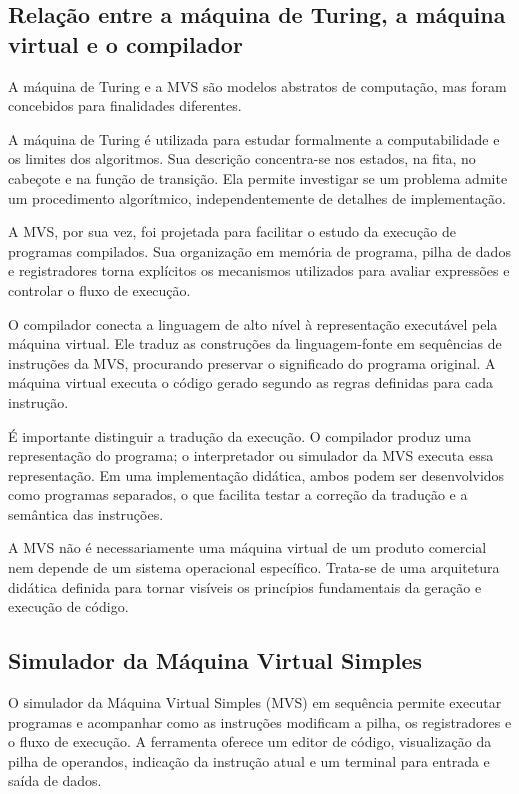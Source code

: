 \documentclass[
  brazilian,
  letterpaper,
]{book}
\theoremstyle{plain}
\theoremstyle{definition}
\theoremstyle{remark}
\begin{document}
\subsection{Relação entre a máquina de Turing, a máquina virtual e o
compilador}\label{relauxe7uxe3o-entre-a-muxe1quina-de-turing-a-muxe1quina-virtual-e-o-compilador}

A máquina de Turing e a MVS são modelos abstratos de computação, mas
foram concebidos para finalidades diferentes.

A máquina de Turing é utilizada para estudar formalmente a
computabilidade e os limites dos algoritmos. Sua descrição concentra-se
nos estados, na fita, no cabeçote e na função de transição. Ela permite
investigar se um problema admite um procedimento algorítmico,
independentemente de detalhes de implementação.

A MVS, por sua vez, foi projetada para facilitar o estudo da execução de
programas compilados. Sua organização em memória de programa, pilha de
dados e registradores torna explícitos os mecanismos utilizados para
avaliar expressões e controlar o fluxo de execução.

O compilador conecta a linguagem de alto nível à representação
executável pela máquina virtual. Ele traduz as construções da
linguagem-fonte em sequências de instruções da MVS, procurando preservar
o significado do programa original. A máquina virtual executa o código
gerado segundo as regras definidas para cada instrução.

É importante distinguir a tradução da execução. O compilador produz uma
representação do programa; o interpretador ou simulador da MVS executa
essa representação. Em uma implementação didática, ambos podem ser
desenvolvidos como programas separados, o que facilita testar a correção
da tradução e a semântica das instruções.

A MVS não é necessariamente uma máquina virtual de um produto comercial
nem depende de um sistema operacional específico. Trata-se de uma
arquitetura didática definida para tornar visíveis os princípios
fundamentais da geração e execução de código.

\subsection{Simulador da Máquina Virtual
Simples}\label{simulador-da-muxe1quina-virtual-simples}

O simulador da Máquina Virtual Simples (MVS) em sequência permite
executar programas e acompanhar como as instruções modificam a pilha, os
registradores e o fluxo de execução. A ferramenta oferece um editor de
código, visualização da pilha de operandos, indicação da instrução atual
e um terminal para entrada e saída de dados.
\end{document}

